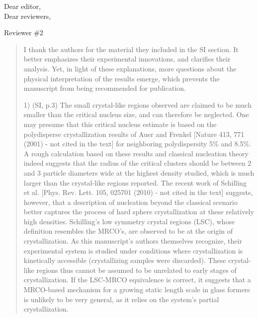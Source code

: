 \documentclass[10pt,a4paper]{letter}
\begin{document}
 
\begin{letter}{}
\opening{Dear editor,\\Dear reviewers,} 
 
Reviewer \#2
\begin{quotation}
I thank the authors for the material they included in the SI section. It better emphasizes their experimental innovations, and clarifies their analysis. Yet, in light of these explanations, more questions about the physical interpretation of the results emerge, which prevents the manuscript from being recommended for publication.

1) (SI, p.3) The small crystal-like regions observed are claimed to be much smaller than the critical nucleus size, and can therefore be neglected. One may presume that this critical nucleus estimate is based on the polydisperse crystallization results of Auer and Frenkel [Nature 413, 771 (2001) - not cited in the text] for neighboring polydispersity 5\% and 8.5\%. A rough calculation based on these results and classical nucleation theory indeed suggests that the radius of the critical clusters should be between 2 and 3 particle diameters wide at the highest density studied, which is much larger than the crystal-like regions reported. The recent work of Schilling et al. [Phys. Rev. Lett. 105, 025701 (2010) - not cited in the text] suggests, however, that a description of nucleation beyond the classical scenario better captures the process of hard sphere crystallization at these relatively high densities. Schilling's low symmetry crystal regions (LSC), whose definition resembles the
MRCO's, are observed to be at the origin of crystallization. As this manuscript's authors themselves recognize, their experimental system is studied under conditions where crystallization is kinetically accessible (crystallizing samples were discarded). These crystal-like regions thus cannot be assumed to be unrelated to early stages of crystallization. If the LSC-MRCO equivalence is correct, it suggests that a MRCO-based mechanism for a growing static length scale in glass formers is unlikely to be very general, as it relies on the system's partial crystallization.


\end{quotation}
\end{letter}
\end{document}
